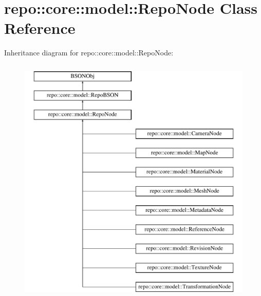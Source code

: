 \hypertarget{classrepo_1_1core_1_1model_1_1_repo_node}{}\section{repo\+:\+:core\+:\+:model\+:\+:Repo\+Node Class Reference}
\label{classrepo_1_1core_1_1model_1_1_repo_node}
Inheritance diagram for repo\+:\+:core\+:\+:model\+:\+:Repo\+Node\+:\begin{figure}[H]
\begin{center}
\leavevmode
\includegraphics[height=12.000000cm]{classrepo_1_1core_1_1model_1_1_repo_node}
\end{center}
\end{figure}
